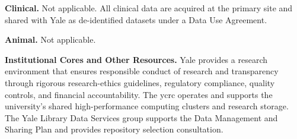 \documentclass[11pt]{article}
\begin{document}
\textbf{Clinical.} Not applicable. All clinical data are acquired at the primary site and shared with Yale as de-identified datasets under a Data Use Agreement.

\textbf{Animal.} Not applicable.

\textbf{Institutional Cores and Other Resources.} Yale provides a research environment that ensures responsible conduct of research and transparency through rigorous research-ethics guidelines, regulatory compliance, quality controls, and financial accountability. The \gls*{ycrc} operates and supports the university's shared high-performance computing clusters and research storage. The Yale Library Data Services group supports the Data Management and Sharing Plan and provides repository selection consultation.
\end{document}
